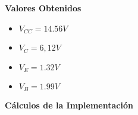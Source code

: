 \begin{multicols}{2}
			\textbf{Valores Obtenidos}
            \begin{itemize}[nosep]
				\item $V_{CC} = 14.56V$
                \item $V_{C} = 6,12V$
                \item $V_{E}= 1.32V$
                \item $V_{B} = 1.99V$\\[5pt]
            \end{itemize}

			\textbf{Cálculos de la Implementación}








\end{multicols}
